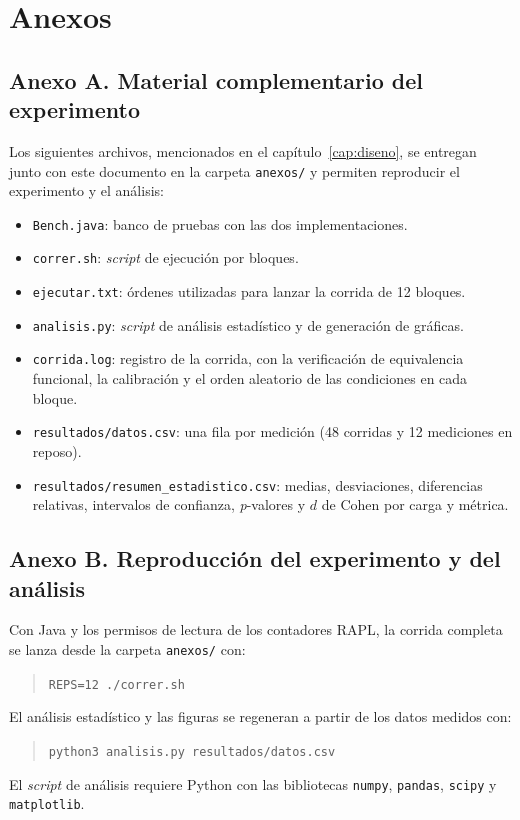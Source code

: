 \clearpage
{}
{}
\chapter*{Anexos}

\section*{Anexo A. Material complementario del experimento}

Los siguientes archivos, mencionados en el capítulo~\ref{cap:diseno}, se entregan junto con este documento en la carpeta \texttt{anexos/} y permiten reproducir el experimento y el análisis:
\begin{itemize}
  \item \texttt{Bench.java}: banco de pruebas con las dos implementaciones.
  \item \texttt{correr.sh}: \textit{script} de ejecución por bloques.
  \item \texttt{ejecutar.txt}: órdenes utilizadas para lanzar la corrida de 12 bloques.
  \item \texttt{analisis.py}: \textit{script} de análisis estadístico y de generación de gráficas.
  \item \texttt{corrida.log}: registro de la corrida, con la verificación de equivalencia funcional, la calibración y el orden aleatorio de las condiciones en cada bloque.
  \item \texttt{resultados/datos.csv}: una fila por medición (48 corridas y 12 mediciones en reposo).
  \item \texttt{resultados/resumen\_estadistico.csv}: medias, desviaciones, diferencias relativas, intervalos de confianza, \textit{p}-valores y $d$ de Cohen por carga y métrica.
\end{itemize}

\section*{Anexo B. Reproducción del experimento y del análisis}

Con Java y los permisos de lectura de los contadores RAPL, la corrida completa se lanza desde la carpeta \texttt{anexos/} con:

\begin{quote}
\texttt{REPS=12 ./correr.sh}
\end{quote}

El análisis estadístico y las figuras se regeneran a partir de los datos medidos con:

\begin{quote}
\texttt{python3 analisis.py resultados/datos.csv}
\end{quote}

El \textit{script} de análisis requiere Python con las bibliotecas \texttt{numpy}, \texttt{pandas}, \texttt{scipy} y \texttt{matplotlib}.
